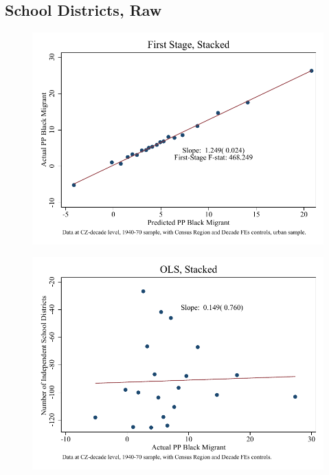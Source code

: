 \documentclass{article}
\begin{document}
\subsection{School Districts, Raw}

\clearpage
\begin{figure}
\centering
\includegraphics{figures/simplefigs/stacked_schdist_ind_raw_C3_urban_fs.pdf}
\end{figure}
\clearpage
\begin{figure}
\centering
\includegraphics{figures/simplefigs/stacked_schdist_ind_raw_C3_urban_ols.pdf}
\end{figure}
\clearpage
\end{document}

